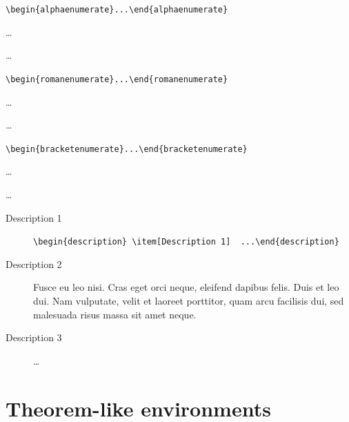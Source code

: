 \documentclass[a4paper,german]{tui-algo-seminar}
\begin{document}
\begin{alphaenumerate}
\item \verb|\begin{alphaenumerate}...\end{alphaenumerate}|
\item \dots
\item \dots
\end{alphaenumerate}

\begin{romanenumerate}
\item \verb|\begin{romanenumerate}...\end{romanenumerate}|
\item \dots
\item \dots
\end{romanenumerate}

\begin{bracketenumerate}
\item \verb|\begin{bracketenumerate}...\end{bracketenumerate}|
\item \dots
\item \dots
\end{bracketenumerate}

\begin{description}
\item[Description 1] \verb|\begin{description} \item[Description 1]  ...\end{description}|
\item[Description 2] Fusce eu leo nisi. Cras eget orci neque, eleifend dapibus felis. Duis et leo dui. Nam vulputate, velit et laoreet porttitor, quam arcu facilisis dui, sed malesuada risus massa sit amet neque.
\item[Description 3]  \dots
\end{description}


\section{Theorem-like environments}
\label{sec:theorem-environments}
\end{document}

